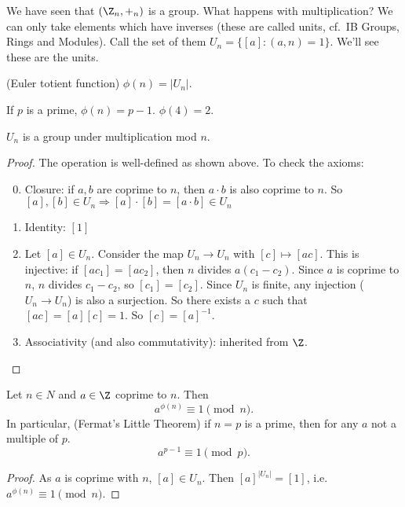 \documentclass[a4paper]{article}
\begin{document}
We have seen that $(\Z_n, +_n)$ is a group. What happens with multiplication? We can only take elements which have inverses (these are called units, cf.\ IB Groups, Rings and Modules). Call the set of them $U_n = \{[a]: (a, n) = 1\}$. We'll see these are the units.
\begin{defi}
  (Euler totient function) $\phi (n) = |U_n|$.
\end{defi}

\begin{eg}
  If $p$ is a prime, $\phi(n) = p - 1$. $\phi(4) = 2$.
\end{eg}

\begin{prop}
  $U_n$ is a group under multiplication mod $n$.
\end{prop}

\begin{proof}
  The operation is well-defined as shown above. To check the axioms:
  \begin{enumerate}[label=\arabic{*}.]
      \setcounter{enumi}{-1}
    \item Closure: if $a, b$ are coprime to $n$, then $a\cdot b$ is also coprime to $n$. So $[a], [b]\in U_n \Rightarrow [a]\cdot [b] = [a\cdot b]\in U_n$
    \item Identity: $[1]$
    \item Let $[a]\in U_n$. Consider the map $U_n \to U_n$ with $[c]\mapsto [ac]$. This is injective: if $[ac_1] = [ac_2]$, then $n $ divides $a(c_1 - c_2)$. Since $a$ is coprime to $n$, $n$ divides $c_1 - c_2$, so $[c_1] = [c_2]$. Since $U_n$ is finite, any injection ($U_n \to U_n$) is also a surjection. So there exists a $c$ such that $[ac] = [a][c] = 1$. So $[c] = [a]^{-1}$.
    \item Associativity (and also commutativity): inherited from $\Z$.
  \end{enumerate}
\end{proof}
\begin{thm} Let $n\in N$ and $a\in \Z$ coprime to $n$. Then
  \[
    a^{\phi(n)} \equiv 1\pmod n.
  \]
  In particular, (Fermat's Little Theorem) if $n = p$ is a prime, then for any $a$ not a multiple of $p$.
  \[
    a^{p - 1}\equiv 1\pmod p.
  \]
\end{thm}

\begin{proof}
  As $a$ is coprime with $n$, $[a]\in U_n$. Then $[a]^{|U_n|} = [1]$, i.e.\ $a^{\phi(n)} \equiv 1\pmod n$.
\end{proof}
\end{document}
